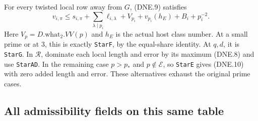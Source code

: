 \documentclass[11pt,a4paper]{article}
\numberwithin{equation}{section}
\theoremstyle{remark}\newtheorem{remark}[theorem]{Remark}
\begin{document}
For every twisted local row away from $G$, (DNE.9) satisfies
\[
 v_{i,\pi}\le s_{i,\pi}+\sum_{\lambda\mid p_i}\ell_{i,\lambda}
       +V_{p_i}+v_{p_i}(h_E)+B_i+p_i^{-2}.               \tag{DNE.10}
\]
Here $V_p=D.\mathrm{what}_2.VV(p)$ and $h_E$ is the actual host
class number.  At a small prime or at $3$, this is exactly
\texttt{Star\allowbreak F}, by the equal-share identity.  At $q,d$, it is
\texttt{Star\allowbreak G}.  In $\mathcal R$, dominate each local length and
error by its maximum (DNE.8) and use \texttt{Star\allowbreak AD}.
In the remaining case $p>p_*$ and $p\notin\mathcal E$, so
\texttt{Star\allowbreak E} gives (DNE.10) with zero added length and error.
These alternatives exhaust the original prime cases.

\subsection{All admissibility fields on this same table}
\end{document}

